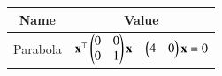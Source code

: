 \begin{tabular}{|c|c|}
\hline
\textbf{Name} & \textbf{Value} \\
\hline
Parabola & $\mathbf{x}^\top\begin{pmatrix}0&0\\0&1\end{pmatrix}\mathbf{x} - \begin{pmatrix}4 & 0\end{pmatrix}\mathbf{x} = 0$ \\
\hline
\end{tabular}
